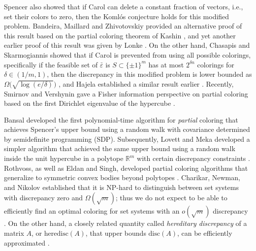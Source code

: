 \documentclass[reqno]{amsart}
\numberwithin{equation}{section}
\newcommand{\R}{\mathbb R}
\newcommand{\eps}{\varepsilon}
\begin{document}
Spencer also showed that if Carol  can delete a constant fraction of vectors, i.e., set their colors to zero, then the Koml\'os conjecture holds for this modified problem\cite{Spe85}. Bandeira, Maillard and  Zhivotovskiy \cite{bandeira2022remark} provided an alternative proof of this result  based on the partial coloring theorem of Kashin \cite{Kashin85}, and yet  another earlier proof of this  result was given by Lonke \cite{Lonke98}.  On the other hand, Chasapis and  Skarmogiannis showed that if Carol is prevented from using all possible colorings, specifically if the feasible set of $\bar \eps $ is $S  \subset \{\pm 1 \}^m$ has  at most $2^{\delta n}$ colorings for $\delta \in (1/m, 1)$, then  the discrepancy  in this modified  problem is  lower bounded as $\Omega \big(\sqrt{\log(e/\delta)}\big)$ \cite{CS21}, and  Hajela established a similar result earlier \cite{hajela88}. Recently, Smirnov and  Vershynin gave a Fisher information perspective on partial coloring based on the first Dirichlet eigenvalue of the hypercube \cite{SV26}.
       

Bansal developed the first polynomial-time  algorithm for \emph{partial} coloring that achieves Spencer's upper bound using  a random walk with covariance determined by semidefinite programming (SDP)\cite{Bansal10}. Subsequently, Lovett and Meka developed a simpler algorithm  that achieved the same upper bound using  a random walk inside the unit hypercube in  a polytope  $\R^m$ with certain discrepancy constraints  \cite{LM15}.   Rothvoss, as well as Eldan and Singh, developed partial coloring algorithms that generalize to symmetric convex bodies beyond polytopes \cite{Rothvoss17, ES18}. Charikar, Newman, and Nikolov  established that it is NP-hard to distinguish between set systems with discrepancy zero and $\Omega(\sqrt {m})$; thus we do not expect to be able to efficiently find an optimal coloring for set systems with an $o(\sqrt {m})$ discrepancy \cite {CNN11}. On the other hand, a closely related quantity called \emph{hereditary discrepancy}  of a matrix $A$, or $\text{heredisc}(A)$, that upper bounds  $\text{disc} (A)$, can be efficiently approximated \cite{MNT20}. 
\end{document}
